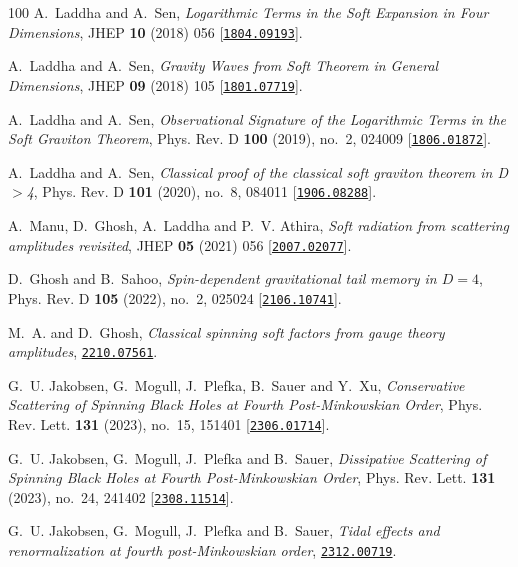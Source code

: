 \begin{thebibliography}{100}
A.~Laddha and A.~Sen,  {\em {Logarithmic Terms in the Soft Expansion in Four
  Dimensions}}, JHEP {\bf 10} (2018) 056
  [\href{http://www.arXiv.org/abs/1804.09193}{{\tt 1804.09193}}].

A.~Laddha and A.~Sen,  {\em {Gravity Waves from Soft Theorem in General
  Dimensions}}, JHEP {\bf 09} (2018) 105
  [\href{http://www.arXiv.org/abs/1801.07719}{{\tt 1801.07719}}].

A.~Laddha and A.~Sen,  {\em {Observational Signature of the Logarithmic Terms
  in the Soft Graviton Theorem}}, Phys. Rev. D {\bf 100} (2019), no.~2, 024009
  [\href{http://www.arXiv.org/abs/1806.01872}{{\tt 1806.01872}}].

A.~Laddha and A.~Sen,  {\em {Classical proof of the classical soft graviton
  theorem in D\ensuremath{>}4}}, Phys. Rev. D {\bf 101} (2020), no.~8, 084011
  [\href{http://www.arXiv.org/abs/1906.08288}{{\tt 1906.08288}}].

A.~Manu, D.~Ghosh, A.~Laddha and P.~V. Athira,  {\em {Soft radiation from
  scattering amplitudes revisited}}, JHEP {\bf 05} (2021) 056
  [\href{http://www.arXiv.org/abs/2007.02077}{{\tt 2007.02077}}].

D.~Ghosh and B.~Sahoo,  {\em {Spin-dependent gravitational tail memory in
  $D=4$}}, Phys. Rev. D {\bf 105} (2022), no.~2, 025024
  [\href{http://www.arXiv.org/abs/2106.10741}{{\tt 2106.10741}}].

M.~A. and D.~Ghosh,  {\em {Classical spinning soft factors from gauge theory
  amplitudes}}, \href{http://www.arXiv.org/abs/2210.07561}{{\tt 2210.07561}}.

G.~U. Jakobsen, G.~Mogull, J.~Plefka, B.~Sauer and Y.~Xu,  {\em {Conservative
  Scattering of Spinning Black Holes at Fourth Post-Minkowskian Order}}, Phys.
  Rev. Lett. {\bf 131} (2023), no.~15, 151401
  [\href{http://www.arXiv.org/abs/2306.01714}{{\tt 2306.01714}}].

G.~U. Jakobsen, G.~Mogull, J.~Plefka and B.~Sauer,  {\em {Dissipative
  Scattering of Spinning Black Holes at Fourth Post-Minkowskian Order}}, Phys.
  Rev. Lett. {\bf 131} (2023), no.~24, 241402
  [\href{http://www.arXiv.org/abs/2308.11514}{{\tt 2308.11514}}].

G.~U. Jakobsen, G.~Mogull, J.~Plefka and B.~Sauer,  {\em {Tidal effects and
  renormalization at fourth post-Minkowskian order}},
  \href{http://www.arXiv.org/abs/2312.00719}{{\tt 2312.00719}}.


\end{thebibliography}

